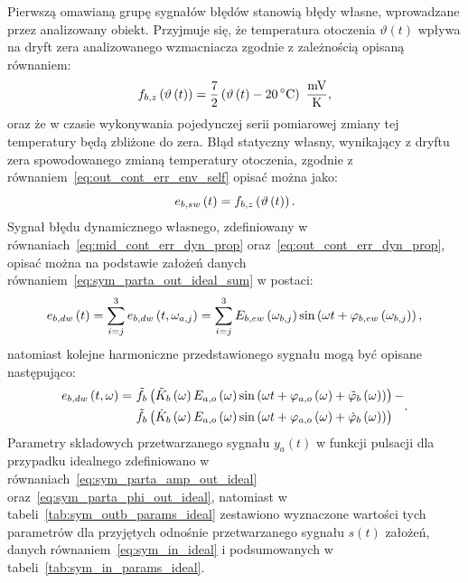 Pierwszą omawianą grupę sygnałów błędów stanowią błędy własne, wprowadzane przez analizowany obiekt. Przyjmuje się, że temperatura otoczenia $\vartheta(t)$ wpływa na dryft zera analizowanego wzmacniacza zgodnie z zależnością opisaną równaniem:
\begin{equation}
f_{b,z} \left( \vartheta \emb{t} \right) = \frac{7}{2} \left( \vartheta \emb{t} - \qty{20}{\degreeCelsius} \right)~\unit{\frac{mV}{K}} \label{eq:sym_partb_temp_err},
\end{equation}
oraz że w czasie wykonywania pojedynczej serii pomiarowej zmiany tej temperatury będą zbliżone do zera. Błąd statyczny własny, wynikający z dryftu zera spowodowanego zmianą temperatury otoczenia, zgodnie z równaniem~\eqref{eq:out_cont_err_env_self} opisać można jako:
\begin{equation}
e_{b,sw} \left(t\right) = f_{b,z} \left( \vartheta \left(t\right) \right) \label{eq:sym_partb_err_sw}.
\end{equation}
Sygnał błędu dynamicznego własnego, zdefiniowany w równaniach~\eqref{eq:mid_cont_err_dyn_prop} oraz~\eqref{eq:out_cont_err_dyn_prop}, opisać można na podstawie założeń danych równaniem~\eqref{eq:sym_parta_out_ideal_sum} w postaci:
\begin{equation}
e_{b,dw} \left(t\right) = \sum _{i = j} ^{3} e_{b,dw} \left(t,\omega_{a,j}\right) = \sum _{i = j} ^{3} E_{b,ew} \left(\omega_{b,j}\right) \sin \left(\omega t + \varphi_{b,ew} \left(\omega_{b,j}\right)\right) \label{eq:sym_partb_dyn_self_sum},
\end{equation}
natomiast kolejne harmoniczne przedstawionego sygnału mogą być opisane następująco:
\begin{equation}
\begin{split}
e_{b,dw} \left(t,\omega\right) =~
& \tilde{f}_{b} \left( \tilde{K}_{b} \left(\omega\right) E_{a,o} \left(\omega\right) \sin \left( \omega t + \varphi_{a,o} \left(\omega\right) + \tilde{\varphi}_{b} \left(\omega\right) \right) \right)- \\
& \tilde{f}_{b} \left( \dot{K}_{b} \left(\omega\right) E_{a,o} \left(\omega\right) \sin \left( \omega t + \varphi_{a,o} \left(\omega\right) + \dot{\varphi}_{b} \left(\omega\right) \right) \right)
\end{split}
\label{eq:sym_partb_dyn_self_err}.
\end{equation}
Parametry składowych przetwarzanego sygnału $y_{a}(t)$ w funkcji pulsacji dla przypadku idealnego zdefiniowano w równaniach~\eqref{eq:sym_parta_amp_out_ideal} oraz~\eqref{eq:sym_parta_phi_out_ideal}, natomiast w tabeli~\ref{tab:sym_outb_params_ideal} zestawiono wyznaczone wartości tych parametrów dla przyjętych odnośnie przetwarzanego sygnału $s(t)$ założeń, danych równaniem~\eqref{eq:sym_in_ideal} i podsumowanych w tabeli~\ref{tab:sym_in_params_ideal}.


